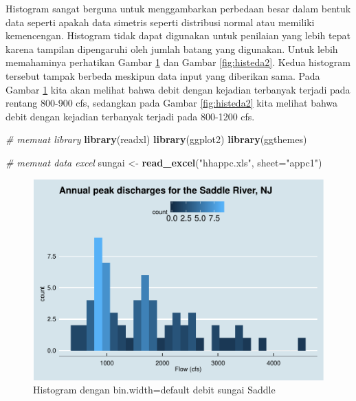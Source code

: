 \documentclass[]{book}
\newenvironment{Shaded}{\begin{snugshade}}{\end{snugshade}}
\newcommand{\KeywordTok}[1]{\textcolor[rgb]{0.13,0.29,0.53}{\textbf{#1}}}
\newcommand{\DataTypeTok}[1]{\textcolor[rgb]{0.13,0.29,0.53}{#1}}
\newcommand{\StringTok}[1]{\textcolor[rgb]{0.31,0.60,0.02}{#1}}
\newcommand{\CommentTok}[1]{\textcolor[rgb]{0.56,0.35,0.01}{\textit{#1}}}
\newcommand{\NormalTok}[1]{#1}
\begin{document}
Histogram sangat berguna untuk menggambarkan perbedaan besar dalam
bentuk data seperti apakah data simetris seperti distribusi normal atau
memiliki kemencengan. Histogram tidak dapat digunakan untuk penilaian
yang lebih tepat karena tampilan dipengaruhi oleh jumlah batang yang
digunakan. Untuk lebih memahaminya perhatikan Gambar \ref{fig:histeda}
dan Gambar \ref{fig:histeda2}. Kedua histogram tersebut tampak berbeda
meskipun data input yang diberikan sama. Pada Gambar \ref{fig:histeda}
kita akan melihat bahwa debit dengan kejadian terbanyak terjadi pada
rentang 800-900 cfs, sedangkan pada Gambar \ref{fig:histeda2} kita
melihat bahwa debit dengan kejadian terbanyak terjadi pada 800-1200 cfs.

\begin{Shaded}
\begin{Highlighting}[]
\CommentTok{# memuat library}
\KeywordTok{library}\NormalTok{(readxl)}
\KeywordTok{library}\NormalTok{(ggplot2)}
\KeywordTok{library}\NormalTok{(ggthemes)}

\CommentTok{# memuat data excel}
\NormalTok{sungai <-}\StringTok{ }\KeywordTok{read_excel}\NormalTok{(}\StringTok{"hhappc.xls"}\NormalTok{, }\DataTypeTok{sheet=}\StringTok{"appc1"}\NormalTok{)}
\end{Highlighting}
\end{Shaded}

\begin{figure}

{\centering \includegraphics[width=0.7\linewidth]{EnvStat_files/figure-latex/histeda-1} 

}

\caption{Histogram dengan bin.width=default debit sungai Saddle}\label{fig:histeda}
\end{figure}
\end{document}
